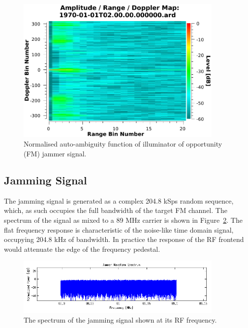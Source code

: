 \documentclass[english, 12pt]{report}
\begin{document}
\begin{figure}[htbp]
\begin{center}
\includegraphics[width=0.9\textwidth]{figs/Simulations/FMAAF.pdf}
\caption{Normalised auto-ambiguity function of illuminator of opportunity (FM) jammer signal.}
\label{fig:FMAAF}
\end{center}
\end{figure}

\subsection{Jamming Signal}
The jamming signal is generated as a complex 204.8 kSps random sequence, which, as such occupies the full bandwidth of the target FM channel. The spectrum of the signal as mixed to a 89 MHz carrier is shown in Figure~\ref{fig:JammerFrequencyResponse}. The flat frequency response is characteristic of the noise-like time domain signal, occupying 204.8 kHz of bandwidth. In practice the response of the RF frontend would attenuate the edge of the frequency pedestal.

\begin{figure}[htbp]
\begin{center}
\includegraphics[width=0.9\textwidth]{figs/Simulations/JammerSpectrum.png}
\caption{The spectrum of the jamming signal shown at its RF frequency.}
\label{fig:JammerFrequencyResponse}
\end{center}
\end{figure}
\end{document}
